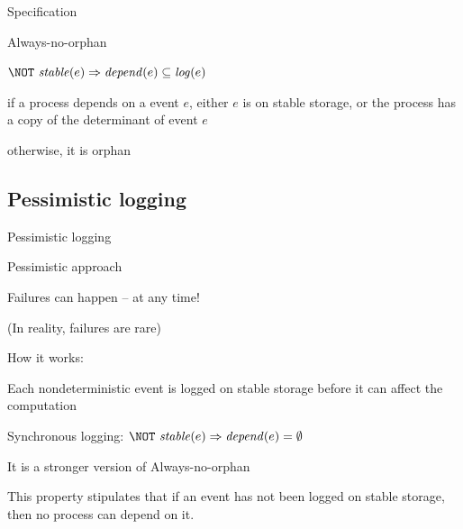 \begin{frame}{Specification}
	
\begin{block}{Always-no-orphan}
\BI
\item $\NOT\ \mathit{stable}(e) \Rightarrow \mathit{depend}(e) \subseteq \mathit{log}(e)$
\item if a process depends on a event $e$, either $e$ is on stable storage, or the process has a copy of the determinant of event $e$
\item otherwise, it is orphan
\EI
\end{block}


\subsection{Pessimistic logging}
	
\end{frame}
\begin{frame}{Pessimistic logging}
\begin{block}{Pessimistic approach}
\BI
\item Failures can happen – at any time!
\item (In reality, failures are rare)
\EI
\end{block}

\medskip
How it works:
\BI
\item Each nondeterministic event is logged on stable storage before it can affect the computation 
\item Synchronous logging: $\NOT\ \mathit{stable}(e) \Rightarrow \mathit{depend}(e) = \emptyset$
\item It is a stronger version of Always-no-orphan
\item This property stipulates that if an event has not been logged on stable storage, then no process can depend on it.
\EI

\end{frame}

